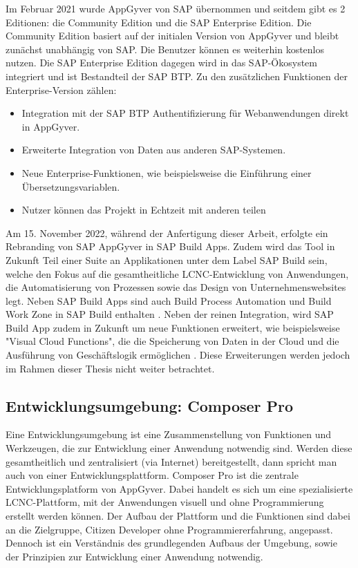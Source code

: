 Im Februar 2021 wurde AppGyver von SAP übernommen und seitdem gibt es 2 Editionen: die Community Edition und die SAP Enterprise Edition. Die Community Edition basiert auf der initialen Version von AppGyver und bleibt zunächst unabhängig von SAP. Die Benutzer können es weiterhin kostenlos nutzen. Die SAP Enterprise Edition dagegen wird in das SAP-Ökosystem integriert und ist Bestandteil der SAP BTP. Zu den zusätzlichen Funktionen der Enterprise-Version zählen: 
 
\begin{itemize}[noitemsep]
\item Integration mit der SAP BTP Authentifizierung für Webanwendungen direkt in AppGyver.
\item Erweiterte Integration von Daten aus anderen SAP-Systemen.
\item Neue Enterprise-Funktionen, wie beispielsweise die Einführung einer Übersetzungsvariablen.
\item Nutzer können das Projekt in Echtzeit mit anderen teilen
\end{itemize}

Am 15. November 2022, während der Anfertigung dieser Arbeit, erfolgte ein Rebranding von SAP AppGyver in SAP Build Apps. Zudem wird das Tool in Zukunft Teil einer Suite an Applikationen unter dem Label SAP Build sein, welche den Fokus auf die gesamtheitliche LCNC-Entwicklung von Anwendungen, die Automatisierung von Prozessen sowie das Design von Unternehmenswebsites legt. Neben SAP Build Apps sind auch Build Process Automation und Build Work Zone in SAP Build enthalten \cite{sap:lcnc}. Neben der reinen Integration, wird SAP Build App zudem in Zukunft um neue Funktionen erweitert, wie beispielsweise "Visual Cloud Functions", die die Speicherung von Daten in der Cloud und die Ausführung von Geschäftslogik ermöglichen \cite{appgyver:coman}. Diese Erweiterungen werden jedoch im Rahmen dieser Thesis nicht weiter betrachtet.

\subsection{Entwicklungsumgebung: Composer Pro}
Eine Entwicklungsumgebung ist eine Zusammenstellung von Funktionen und Werkzeugen, die zur Entwicklung einer Anwendung notwendig sind. Werden diese gesamtheitlich und zentralisiert (via Internet) bereitgestellt, dann spricht man auch von einer Entwicklungsplattform. Composer Pro ist die zentrale Entwicklungsplatform von AppGyver. Dabei handelt es sich um eine spezialisierte LCNC-Plattform, mit der Anwendungen visuell und ohne Programmierung erstellt werden können. Der Aufbau der Plattform und die Funktionen sind dabei an die Zielgruppe, Citizen Developer ohne Programmiererfahrung, angepasst. Dennoch ist ein Verständnis des grundlegenden Aufbaus der Umgebung, sowie der Prinzipien zur Entwicklung einer Anwendung notwendig.

